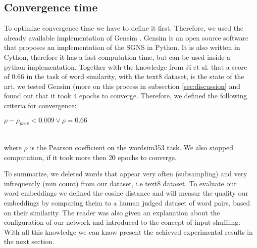 \subsection{Convergence time}
To optimize convergence time we have to define it first. Therefore, we used the already available implementation of Gensim \cite{gensim}. Gensim is an open source software that proposes an implementation of the SGNS in Python. It is also written in Cython, therefore it has a fast computation time, but can be used inside a python implementation. Together with the knowledge from Ji et al.\cite{intel} that a score of $0.66$ in the task of word similarity, with the text8 dataset, is the state of the art, we tested Gensim (more on this process in subsection \ref{sec:discussion} and found out that it took 4 epochs to converge. Therefore, we defined the following criteria for convergence: \\
\centerline{$\rho - \rho_{prev} < 0.009 \vee \rho = 0.66$} \\
where $\rho$ is the Pearson coefficient on the wordsim353 task.
We also stopped computation, if it took more then 20 epochs to converge.

To summarize, we deleted words that appear very often (subsampling) and very infrequently (min count) from our dataset, i.e text8 dataset. To evaluate our word embeddings we defined the cosine distance and will measur the quality our embeddings by comparing theim  to a human judged dataset of word pairs, based on their similarity. The reader was also given an explanation about the configuration of our network and introduced to the concept of input shuffling. With all this knowledge we can know present the achieved experimental results in the next section.
